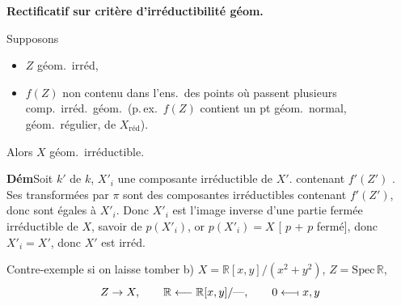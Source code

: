 \documentclass[11pt,a4paper]{article}
\begin{document}
\textbf{Rectificatif sur critère d'irréductibilité géom.}




Supposons
\begin{itemize}
  \item[a)] $Z$ géom.\ irréd,
  \item[b)] $f(Z)$ non contenu dans l'ens.\ des points \struck{\ill{}} où
    passent plusieurs comp.\ irréd.\ géom.\ (p.\,ex.\ $f(Z)$ contient un pt
    géom.\ normal,  \struck{\ill{}} géom.\ régulier, de $X_{\mathrm{réd}}$).
\end{itemize}
Alors $X$ géom.\ irréductible.

\textbf{Dém}
Soit $k'$   de $k$,
 $X'_i$ une composante irréductible de $X'$. 
contenant $f'(Z')$ \add{\ill{}}. Ses transformées par $\pi$ sont des
composantes irréductibles contenant $f'(Z')$, donc sont égales à
\struck{\ill{}} $X'_i$. Donc $X'_i$ est l'image inverse d'une partie fermée
irréductible de $X$, savoir de $p(X'_i)$, or $p(X'_i) = X$ [ \struck{\ill{}} $p$
+ $p$ fermé], donc $X'_i = X'$, donc $X'$ est irréd.

Contre-exemple si on laisse tomber b)\qquad
$X = \mathbb{R}[x,y]/(x^2 + y^2)$, $Z = \mathrm{Spec}\,\mathbb{R}$,
\[
  Z \to X, \qquad \mathbb{R} \longleftarrow \mathbb{R}[x,y]/\text{---},
  \qquad 0 \longleftarrow\!\shortmid x, y
\]

\end{document}
